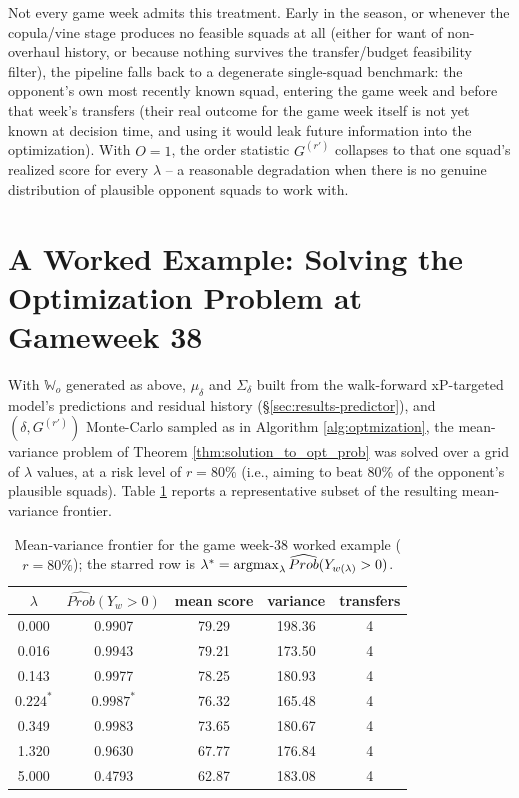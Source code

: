 			Not every game week admits this treatment. Early in the season, or whenever the copula/vine stage produces no feasible squads at all (either for want of non-overhaul history, or because nothing survives the transfer/budget feasibility filter), the pipeline falls back to a degenerate single-squad benchmark: the opponent's own most recently known squad, entering the game week and before that week's transfers (their real outcome for the game week itself is not yet known at decision time, and using it would leak future information into the optimization). With $O=1$, the order statistic $G^{(r')}$ collapses to that one squad's realized score for every $\lambda$ -- a reasonable degradation when there is no genuine distribution of plausible opponent squads to work with.

		\section{A Worked Example: Solving the Optimization Problem at Gameweek 38} \label{sec:results-worked-example}
			With $\mathbb{W}_o$ generated as above, $\mu_\delta$ and $\Sigma_\delta$ built from the walk-forward xP-targeted model's predictions and residual history (\S\ref{sec:results-predictor}), and $(\delta, G^{(r')})$ Monte-Carlo sampled as in Algorithm \ref{alg:optmization}, the mean-variance problem of Theorem \ref{thm:solution_to_opt_prob} was solved over a grid of $\lambda$ values, at a risk level of $r = 80\%$ (i.e., aiming to beat 80\% of the opponent's plausible squads). Table \ref{tab:gw38-frontier} reports a representative subset of the resulting mean-variance frontier.

			\begin{table}[H]
				\begin{center}
					\begin{tabular}{|c|c|c|c|c|}
						\hline
						$\lambda$ & $\widehat{Prob}(Y_w>0)$ & mean score & variance & transfers \\
						\hline
						0.000 & 0.9907 & 79.29 & 198.36 & 4 \\
						\hline
						0.016 & 0.9943 & 79.21 & 173.50 & 4 \\
						\hline
						0.143 & 0.9977 & 78.25 & 180.93 & 4 \\
						\hline
						$0.224^{*}$ & $0.9987^{*}$ & 76.32 & 165.48 & 4 \\
						\hline
						0.349 & 0.9983 & 73.65 & 180.67 & 4 \\
						\hline
						1.320 & 0.9630 & 67.77 & 176.84 & 4 \\
						\hline
						5.000 & 0.4793 & 62.87 & 183.08 & 4 \\
						\hline
					\end{tabular}
				\end{center}
				\caption{Mean-variance frontier for the game week-38 worked example ($r=80\%$); the starred row is $\lambda^*=\operatorname*{argmax}_\lambda \widehat{Prob}(Y_{w(\lambda)}>0)$.}
				\label{tab:gw38-frontier}
			\end{table}

